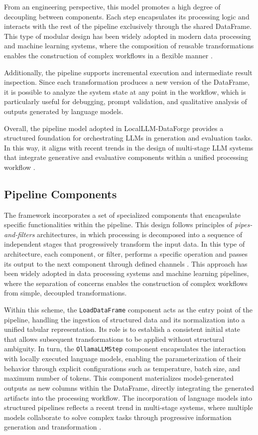 \documentclass[pdflatex,sn-mathphys-num]{sn-jnl}%
\theoremstyle{thmstyleone}%
\theoremstyle{thmstyletwo}%
\theoremstyle{thmstylethree}%
\begin{document}
From an engineering perspective, this model promotes a high degree of decoupling between components. Each step encapsulates its processing logic and interacts with the rest of the pipeline exclusively through the shared DataFrame. This type of modular design has been widely adopted in modern data processing and machine learning systems, where the composition of reusable transformations enables the construction of complex workflows in a flexible manner \cite{dataflow_llm}.

Additionally, the pipeline supports incremental execution and intermediate result inspection. Since each transformation produces a new version of the DataFrame, it is possible to analyze the system state at any point in the workflow, which is particularly useful for debugging, prompt validation, and qualitative analysis of outputs generated by language models.

Overall, the pipeline model adopted in LocalLLM-DataForge provides a structured foundation for orchestrating LLMs in generation and evaluation tasks. In this way, it aligns with recent trends in the design of multi-stage LLM systems that integrate generative and evaluative components within a unified processing workflow \cite{llm_pipeline_eval}.

\subsection{Pipeline Components}

The framework incorporates a set of specialized components that encapsulate specific functionalities within the pipeline. This design follows principles of \textit{pipes-and-filters} architectures, in which processing is decomposed into a sequence of independent stages that progressively transform the input data. In this type of architecture, each component, or filter, performs a specific operation and passes its output to the next component through defined channels \cite{pipes_filters}. This approach has been widely adopted in data processing systems and machine learning pipelines, where the separation of concerns enables the construction of complex workflows from simple, decoupled transformations.

Within this scheme, the \texttt{LoadDataFrame} component acts as the entry point of the pipeline, handling the ingestion of structured data and its normalization into a unified tabular representation. Its role is to establish a consistent initial state that allows subsequent transformations to be applied without structural ambiguity. In turn, the \texttt{OllamaLLMStep} component encapsulates the interaction with locally executed language models, enabling the parameterization of their behavior through explicit configurations such as temperature, batch size, and maximum number of tokens. This component materializes model-generated outputs as new columns within the DataFrame, directly integrating the generated artifacts into the processing workflow. The incorporation of language models into structured pipelines reflects a recent trend in multi-stage systems, where multiple models collaborate to solve complex tasks through progressive information generation and transformation \cite{llm_multistage}.
\end{document}
